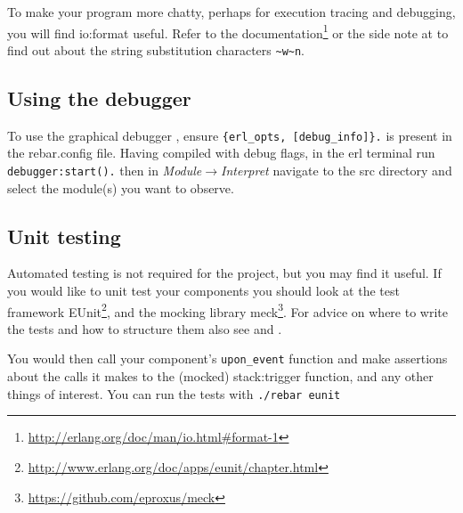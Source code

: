 \documentclass[a4paper]{article}
\begin{document}
To make your program more chatty, perhaps for execution tracing and debugging,
you will find io:format useful. Refer to
the documentation\footnote{\url{http://erlang.org/doc/man/io.html\#format-1}}
or the side note at \cite{lyse_function_syntax} to
find out about the string substitution characters \verb!~w~n!.


\subsection{Using the debugger} %
\label{sub:using_the_debugger}

To use the graphical debugger \cite{manual_debugger}, ensure
\verb!{erl_opts, [debug_info]}.! is present in the rebar.config file.
Having compiled with debug flags, in the erl terminal run \verb!debugger:start().!
then in \emph{Module$\rightarrow$Interpret} navigate to the src directory and select the
module(s) you want to observe.


\subsection{Unit testing} %
\label{sub:unit_testing}

Automated testing is not required for the project, but you may find it useful.
If you would like to unit test your components you should look at the test
framework
EUnit\footnote{\url{http://www.erlang.org/doc/apps/eunit/chapter.html}}, and
the mocking library meck\footnote{\url{https://github.com/eproxus/meck}}. For
advice on where to write the tests and how to structure them also see
\cite{mochimedia_test} and \cite{so_eunit_q}.

You would then call your component's \verb!upon_event! function and make
assertions about the calls it makes to the (mocked) stack:trigger function,
and any other things of interest. You can run the tests with
\verb!./rebar eunit!


\end{document}
